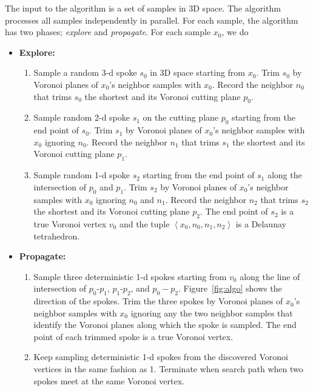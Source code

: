 \documentclass[12pt] {article}
\begin{document}
The input to the algorithm is a set of samples in 3D space. The algorithm processes all samples independently in parallel. For each sample, the algorithm has two phases; \emph{explore} and \emph{propagate}. For each sample $x_{0}$, we do
 
\begin{itemize}
\item \textbf{Explore:}
\begin{enumerate}
\item Sample a random 3-d spoke $s_{0}$ in 3D space starting from $x_{0}$. Trim $s_{0}$ by Voronoi planes of $x_{0}$'s neighbor samples with $x_{0}$. Record the neighbor $n_{0}$ that trims $s_{0}$ the shortest and its Voronoi cutting plane $p_{0}$. 
\item Sample random 2-d spoke $s_{1}$ on the cutting plane $p_{0}$ starting from the end point of $s_{0}$. Trim $s_{1}$ by Voronoi planes of $x_{0}$'s neighbor samples with $x_{0}$ ignoring $n_{0}$. Record the neighbor $n_{1}$ that trims $s_{1}$ the shortest and its Voronoi cutting plane $p_{1}$. 

\item  Sample random 1-d spoke $s_{2}$ starting from the end point of $s_{1}$ along the intersection of $p_{0}$ and $p_{1}$. Trim $s_{2}$ by Voronoi planes of $x_{0}$'s neighbor samples with $x_{0}$ ignoring $n_{0}$ and $n_{1}$. Record the neighbor $n_{2}$ that trims $s_{2}$ the shortest and its Voronoi cutting plane $p_{2}$. The end point of $s_{2}$ is a true Voronoi vertex $v_{0}$ and the tuple $\left\langle x_{0}, n_{0}, n_{1}, n_{2} \right\rangle$ is a Delaunay tetrahedron. 
\end{enumerate}
\end{itemize}

\begin{itemize}
\item \textbf{Propagate:}
\begin{enumerate}
\item Sample three deterministic 1-d spokes starting from $v_{0}$ along the line of intersection of $p_{0}$-$p_{1}$, $p_{1}$-$p_{2}$, and $p_{0}-p_{2}$. Figure~\ref{fig:algo} shows the direction of the spokes. Trim the three spokes by Voronoi planes of $x_{0}$'s neighbor samples with $x_{0}$ ignoring any the two neighbor samples that identify the Voronoi planes along which the spoke is sampled. The end point of each trimmed spoke is a true Voronoi vertex. 
\item Keep sampling deterministic 1-d spokes from the discovered Voronoi vertices in the same fashion as 1. Terminate when search path when two spokes meet at the same Voronoi vertex.  
\end{enumerate}
\end{itemize}
\end{document}

